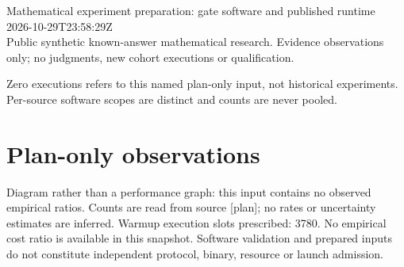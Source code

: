 \documentclass[11pt]{article}
\begin{document}
\raggedright\sloppy
{\LARGE Mathematical experiment preparation: gate software and published runtime}\\[5pt]
2026-10-29T23:58:29Z\\
Public synthetic known-answer mathematical research. Evidence observations only; no judgments, new cohort executions or qualification.

Zero executions refers to this named plan-only input, not historical experiments. Per-source software scopes are distinct and counts are never pooled.
\section*{Plan-only observations}
\begin{center}\end{center}
Diagram rather than a performance graph: this input contains no observed empirical ratios. Counts are read from source [plan]; no rates or uncertainty estimates are inferred.
Warmup execution slots prescribed: 3780. No empirical cost ratio is available in this snapshot. Software validation and prepared inputs do not constitute independent protocol, binary, resource or launch admission.
\end{document}
